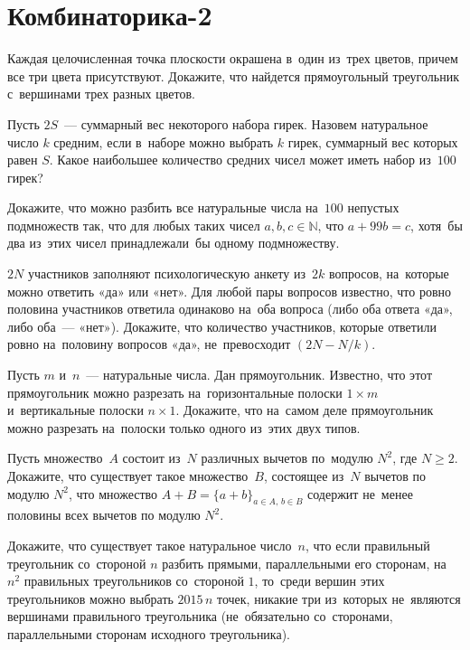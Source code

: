 
\section*{Комбинаторика-2}


\begin{problems}

\item
Каждая целочисленная точка плоскости окрашена в~один из~трех цветов, причем все
три цвета присутствуют.
Докажите, что найдется прямоугольный треугольник с~вершинами трех разных
цветов.

\item
Пусть $2 S$~— суммарный вес некоторого набора гирек.
Назовем натуральное число $k$ средним, если в~наборе можно выбрать $k$ гирек,
суммарный вес которых равен $S$.
Какое наибольшее количество средних чисел может иметь набор из~$100$ гирек?

\item
Докажите, что можно разбить все натуральные числа на~$100$ непустых подмножеств
так, что для любых таких чисел $a, b, c \in \mathbb{N}$, что $a + 99 b = c$,
хотя~бы два из~этих чисел принадлежали~бы одному подмножеству.

\item
$2 N$ участников заполняют психологическую анкету из~$2 k$ вопросов, на~которые
можно ответить «да» или «нет».
Для любой пары вопросов известно, что ровно половина участников ответила
одинаково на~оба вопроса (либо оба ответа «да», либо оба~— «нет»).
Докажите, что количество участников, которые ответили ровно на~половину
вопросов «да», не~превосходит $(2 N - N / k)$.

\item
Пусть $m$ и~$n$~— натуральные числа.
Дан прямоугольник.
Известно, что этот прямоугольник можно разрезать на~горизонтальные полоски
$1 \times m$ и~вертикальные полоски $n \times 1$.
Докажите, что на~самом деле прямоугольник можно разрезать на~полоски только
одного из~этих двух типов.

\item
Пусть множество~$A$ состоит из~$N$ различных вычетов по~модулю $N^2$, где
$N \geq 2$.
Докажите, что существует такое множество~$B$, состоящее из~$N$ вычетов
по модулю $N^2$, что множество
\(
    A + B = \{ a + b \}_{a \in A, \, b \in B}
\)
содержит не~менее половины всех вычетов по модулю $N^2$.

\item
Докажите, что существует такое натуральное число~$n$, что если правильный
треугольник со~стороной $n$ разбить прямыми, параллельными его сторонам,
на~$n^2$ правильных треугольников со~стороной $1$, то~среди вершин этих
треугольников можно выбрать $2015 \, n$ точек, никакие три из~которых
не~являются вершинами правильного треугольника (не~обязательно со~сторонами,
параллельными сторонам исходного треугольника).

\end{problems}

